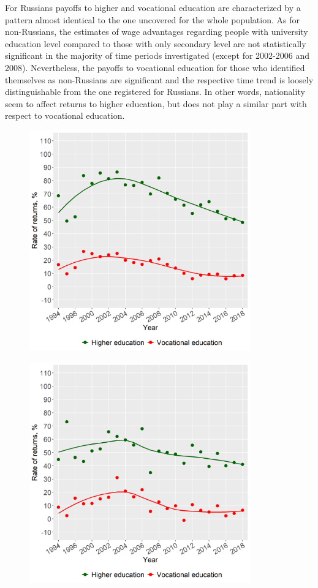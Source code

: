 \documentclass[12pt,a4paper]{article}
\begin{document}
For Russians payoffs to higher and vocational education are characterized by a pattern almost identical to the one uncovered for the whole population. As for non-Russians, the estimates of wage advantages regarding people with university education level compared to those with only secondary level are not statistically significant in the majority of time periods investigated (except for 2002-2006 and 2008). Nevertheless, the payoffs to vocational education for those who identified themselves as non-Russians are significant and the respective time trend is loosely distinguishable from the one registered for Russians. In other words, nationality seem to affect returns to higher education, but does not play a similar part with respect to vocational education.


\begin{figure}[H]
  \begin{minipage}[b]{.5\linewidth}
     \centering
     \hspace*{-0.7in}
     \includegraphics[width=270pt]{p3a.png}
     \label{fig:3a}
  \end{minipage}
  \hfill
  \begin{minipage}[b]{.5\linewidth}
     \centering
     \hspace*{0in}
     \includegraphics[width=270pt]{p3b.png}

\end{minipage}
\end{figure}
\end{document}

